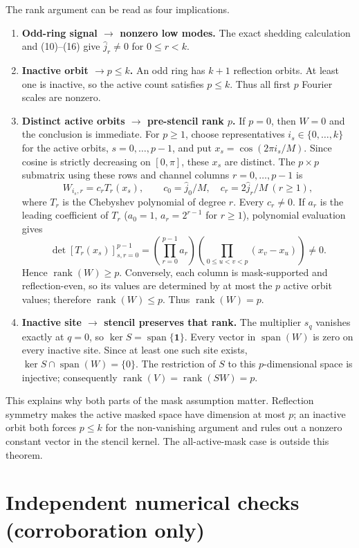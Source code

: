\documentclass[11pt]{article}
\begin{document}
The rank argument can be read as four implications.
\begin{enumerate}
 \item \textbf{Odd-ring signal $\to$ nonzero low modes.} The exact shedding calculation and (10)--(16) give $\widehat j_r\ne0$ for $0\leq r<k$.
 \item \textbf{Inactive orbit $\to p\leq k$.} An odd ring has $k+1$ reflection orbits. At least one is inactive, so the active count satisfies $p\leq k$. Thus all first $p$ Fourier scales are nonzero.
 \item \textbf{Distinct active orbits $\to$ pre-stencil rank $p$.} If $p=0$, then $W=0$ and the conclusion is immediate. For $p\geq1$, choose representatives $i_s\in\{0,\ldots,k\}$ for the active orbits, $s=0,\ldots,p-1$, and put $x_s=\cos(2\pi i_s/M)$. Since cosine is strictly decreasing on $[0,\pi]$, these $x_s$ are distinct. The $p\times p$ submatrix using these rows and channel columns $r=0,\ldots,p-1$ is
 \[
  W_{i_s,r}=c_r T_r(x_s),\qquad c_0=\widehat j_0/M,\quad c_r=2\widehat j_r/M\ (r\geq1),
 \]
 where $T_r$ is the Chebyshev polynomial of degree $r$. Every $c_r\ne0$. If $a_r$ is the leading coefficient of $T_r$ ($a_0=1$, $a_r=2^{r-1}$ for $r\geq1$), polynomial evaluation gives
 \[
  \det[T_r(x_s)]_{s,r=0}^{p-1}
  =\left(\prod_{r=0}^{p-1}a_r\right)
   \left(\prod_{0\leq u<v<p}(x_v-x_u)\right)\ne0.
 \]
 Hence $\operatorname{rank}(W)\geq p$. Conversely, each column is mask-supported and reflection-even, so its values are determined by at most the $p$ active orbit values; therefore $\operatorname{rank}(W)\leq p$. Thus $\operatorname{rank}(W)=p$.
 \item \textbf{Inactive site $\to$ stencil preserves that rank.} The multiplier $s_q$ vanishes exactly at $q=0$, so $\ker S=\operatorname{span}\{\mathbf1\}$. Every vector in $\operatorname{span}(W)$ is zero on every inactive site. Since at least one such site exists, $\ker S\cap\operatorname{span}(W)=\{0\}$. The restriction of $S$ to this $p$-dimensional space is injective; consequently $\operatorname{rank}(V)=\operatorname{rank}(SW)=p$.
\end{enumerate}

This explains why both parts of the mask assumption matter. Reflection symmetry makes the active masked space have dimension at most $p$; an inactive orbit both forces $p\leq k$ for the non-vanishing argument and rules out a nonzero constant vector in the stencil kernel. The all-active-mask case is outside this theorem.

\section{Independent numerical checks (corroboration only)}
\end{document}
